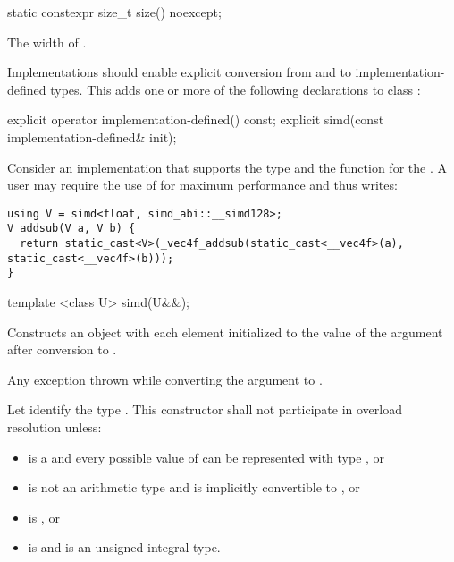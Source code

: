 \begin{itemdecl}
static constexpr size_t size() noexcept;
\end{itemdecl}
\begin{itemdescr}
  \pnum\returns The width of \simd[<T, Abi>].
\end{itemdescr}

\pnum Implementations should enable explicit conversion from and to implementation-defined types.
This adds one or more of the following declarations to class \simd:
\begin{itemdecl}
  explicit operator implementation-defined() const;
  explicit simd(const implementation-defined& init);
\end{itemdecl}

\begin{exampleEnv}\label{impl-conversion-example}
  Consider an implementation that supports the type  and the function  for the \currentTarget.
  A user may require the use of  for maximum performance and thus writes:
  \begin{lstlisting}[style=Vc]
using V = simd<float, simd_abi::__simd128>;
V addsub(V a, V b) {
  return static_cast<V>(_vec4f_addsub(static_cast<__vec4f>(a), static_cast<__vec4f>(b)));
}
  \end{lstlisting}
\end{exampleEnv}


%

\begin{itemdecl}
template <class U> simd(U&&);
\end{itemdecl}
\begin{itemdescr}
  \pnum\effects Constructs an object with each element initialized to the value of the argument after conversion to .

  \pnum\throws Any exception thrown while converting the argument to .

  \pnum\remarks
  Let  identify the type .
  This constructor shall not participate in overload resolution unless:
  \begin{itemize}
    \item {} is a \realArithmeticType and every possible value of  can be represented with type , or
    \item {} is not an arithmetic type and is implicitly convertible to , or
    \item {} is \intt, or
    \item {} is \uint and  is an unsigned integral type.
  \end{itemize}
\end{itemdescr}

